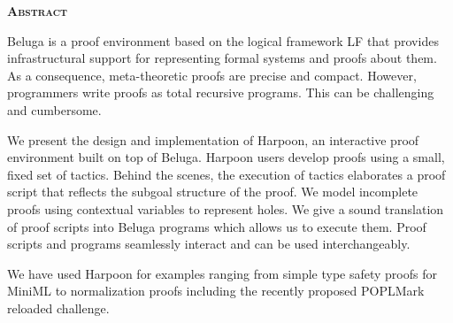 \begin{center}
  \bfseries\textsc{Abstract}
\end{center}

Beluga is a proof environment based on the logical framework LF that provides
infrastructural support for representing formal systems and proofs about them.
As a consequence, meta-theoretic proofs are precise and compact. However,
programmers write proofs as total recursive programs. This can be challenging
and cumbersome.

We present the design and implementation of Harpoon, an interactive proof
environment built on top of Beluga. Harpoon users develop proofs using a small,
fixed set of tactics. Behind the scenes, the execution of tactics elaborates a
proof script that reflects the subgoal structure of the proof. We model
incomplete proofs using contextual variables to represent holes.
We give a sound translation of proof scripts into Beluga programs which allows
us to execute them. Proof scripts and programs seamlessly interact and can be
used interchangeably.

We have used Harpoon for examples ranging from simple type safety
proofs for MiniML to normalization proofs including
the recently proposed POPLMark reloaded challenge.

\vfill



